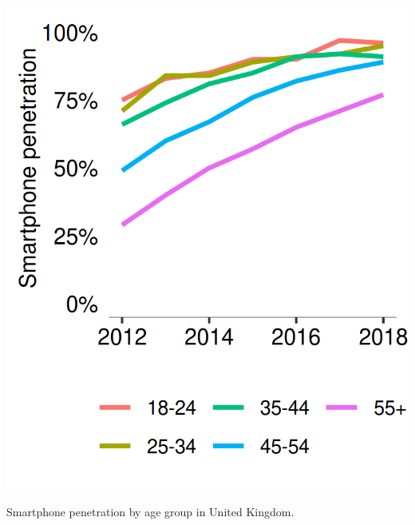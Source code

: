 \begin{marginfigure}
  \forceversofloat
  \includegraphics{images/mobile-ownership.png}
  \caption{Smartphone penetration by age group in United Kingdom.}
  \label{figure:collection:ownership}
\end{marginfigure}



